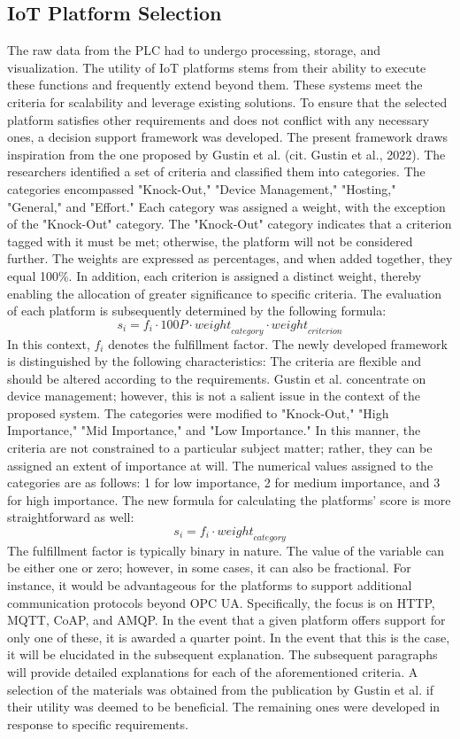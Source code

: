 \subsection{IoT Platform Selection} 
The raw data from the PLC had to undergo processing, storage, and visualization. The utility of IoT platforms stems from their ability to execute these functions and frequently extend beyond them.  These systems meet the criteria for scalability and leverage existing solutions. To ensure that the selected platform satisfies other requirements and does not conflict with any necessary ones, a decision support framework was developed. The present framework draws inspiration from the one proposed by Gustin et al. (cit. Gustin et al., 2022). The researchers identified a set of criteria and classified them into categories. The categories encompassed "Knock-Out," "Device Management," "Hosting," "General," and "Effort." Each category was assigned a weight, with the exception of the "Knock-Out" category. The "Knock-Out" category indicates that a criterion tagged with it must be met; otherwise, the platform will not be considered further. The weights are expressed as percentages, and when added together, they equal 100\%. In addition, each criterion is assigned a distinct weight, thereby enabling the allocation of greater significance to specific criteria. The evaluation of each platform is subsequently determined by the following formula:
\[ s_i = f_i \cdot 100P \cdot \mathit{weight}_{category} \cdot \mathit{weight}_{criterion} \]
In this context, $f_i$ denotes the fulfillment factor.
The newly developed framework is distinguished by the following characteristics: The criteria are flexible and should be altered according to the requirements. Gustin et al. concentrate on device management; however, this is not a salient issue in the context of the proposed system. The categories were modified to "Knock-Out," "High Importance," "Mid Importance," and "Low Importance." In this manner, the criteria are not constrained to a particular subject matter; rather, they can be assigned an extent of importance at will. The numerical values assigned to the categories are as follows: 1 for low importance, 2 for medium importance, and 3 for high importance. The new formula for calculating the platforms' score is more straightforward as well:
\[ s_i = f_i \cdot \mathit{weight}_{category} \]
The fulfillment factor is typically binary in nature. The value of the variable can be either one or zero; however, in some cases, it can also be fractional. For instance, it would be advantageous for the platforms to support additional communication protocols beyond OPC UA. Specifically, the focus is on HTTP, MQTT, CoAP, and AMQP. In the event that a given platform offers support for only one of these, it is awarded a quarter point. In the event that this is the case, it will be elucidated in the subsequent explanation.
The subsequent paragraphs will provide detailed explanations for each of the aforementioned criteria. A selection of the materials was obtained from the publication by Gustin et al. if their utility was deemed to be beneficial. The remaining ones were developed in response to specific requirements.

